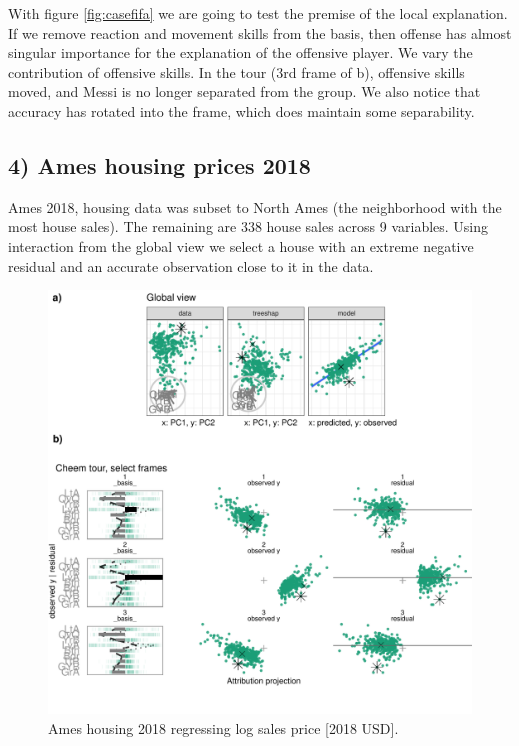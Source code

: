 \documentclass[
]{article}
\begin{document}
With figure \ref{fig:casefifa} we are going to test the premise of the local explanation. If we remove reaction and movement skills from the basis, then offense has almost singular importance for the explanation of the offensive player. We vary the contribution of offensive skills. In the tour (3rd frame of b), offensive skills moved, and Messi is no longer separated from the group. We also notice that accuracy has rotated into the frame, which does maintain some separability.

\hypertarget{ames-housing-prices-2018}{%
\subsection{4) Ames housing prices 2018}\label{ames-housing-prices-2018}}

Ames 2018, housing data was subset to North Ames (the neighborhood with the most house sales). The remaining are 338 house sales across 9 variables. Using interaction from the global view we select a house with an extreme negative residual and an accurate observation close to it in the data.

\begin{figure}

{\centering \includegraphics[width=1\linewidth]{./figures/case_ames2018} 

}

\caption{Ames housing 2018 regressing log sales price [2018 USD].}\label{fig:caseames}
\end{figure}
\end{document}
